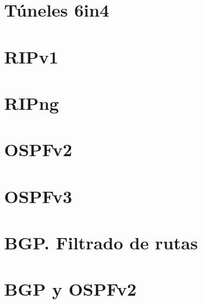 \documentclass{article}
\begin{document}
\tableofcontents

\section{Túneles 6in4}
  

\section{RIPv1}
  

\newpage

\section{RIPng}
  

\newpage

\section{OSPFv2}
  

\newpage

\section{OSPFv3}
  

\newpage

\section{BGP. Filtrado de rutas}
  

\section{BGP y OSPFv2}
  
\end{document}
